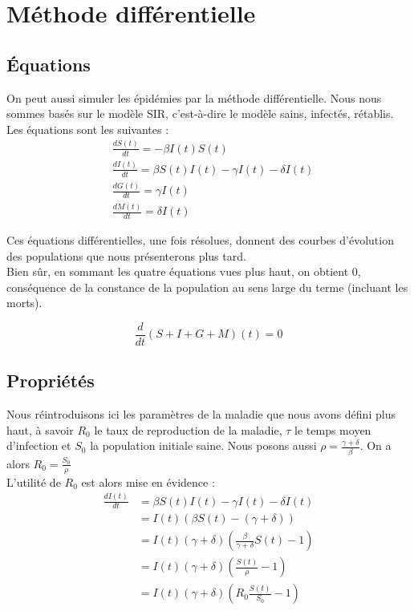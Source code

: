 \documentclass{article}
\begin{document}
\section{Méthode différentielle}
\subsection{Équations}
	On peut aussi simuler les épidémies par la méthode différentielle. Nous nous sommes basés sur le modèle SIR, c'est-à-dire le modèle sains, infectés, rétablis. Les équations sont les suivantes :\\
	\begin{align}
		&\frac{dS(t)}{dt} = - \beta I(t)S(t) \\
		&\frac{dI(t)}{dt} = \beta S(t)I(t) - \gamma I(t) - \delta I(t) \\
		&\frac{dG(t)}{dt} = \gamma I(t)\\
		&\frac{dM(t)}{dt} = \delta I(t)
			\end{align}
	
	Ces équations différentielles, une fois résolues, donnent des courbes d'évolution des populations que nous présenterons plus tard.\\
	Bien sûr, en sommant les quatre équations vues plus haut, on obtient $0$, conséquence de la constance de la population au sens large du terme (incluant les morts).
	
	$$\frac{d}{dt}(S+I+G+M)(t)=0$$

\subsection{Propriétés}
	Nous réintroduisons ici les paramètres de la maladie que nous avons défini plus haut, à savoir $R_0$ le taux de reproduction de la maladie, $\tau$ le temps moyen d'infection et $S_0$ la population initiale saine. Nous posons aussi $\rho = \frac{\gamma + \delta}{\beta}$. On a alors $R_0 = \frac{S_0}{\rho}$ \\
	L'utilité de $R_0$ est alors mise en évidence : \\
	\begin{align*}	
	\frac{dI(t)}{dt} &= \beta S(t)I(t) - \gamma I(t) - \delta I(t) \\
					 &= I(t)(\beta S(t) - (\gamma + \delta) ) \\
					 &= I(t)(\gamma + \delta)(\frac{\beta}{\gamma + \delta}S(t) - 1) \\ 
					 &= I(t)(\gamma + \delta)(\frac{S(t)}{\rho} - 1) \\
					 &= I(t)(\gamma + \delta)(R_0 \frac{S(t)}{S_0} - 1)	
	\end{align*}
	
\end{document}

